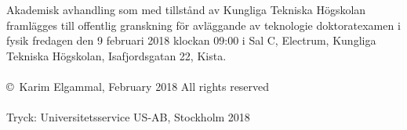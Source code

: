 \vspace*{10cm}


\noindent {}
\vspace*{5mm}
\noindent Akademisk avhandling som med tillstånd av Kungliga Tekniska Högskolan framlägges till offentlig granskning för avläggande av teknologie doktoratexamen i fysik fredagen den 9 februari 2018 klockan 09:00 i Sal C, Electrum, Kungliga Tekniska Högskolan, Isafjordsgatan 22, Kista.\\ \\
\copyright\ Karim Elgammal, February 2018 All rights reserved\\ \\
Tryck: Universitetsservice US-AB, Stockholm 2018
\clearpage
\endinput
